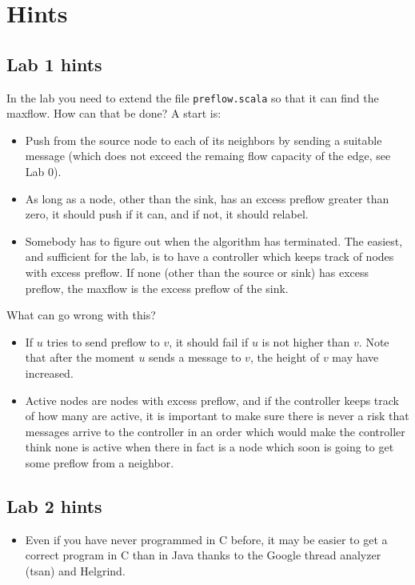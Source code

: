 \documentclass{forsete}
\begin{document}
{\section{Hints}
\subsection*{Lab 1 hints}
In the lab you need to extend the file \verb!preflow.scala! so that it can find the maxflow.
How can that be done? A start is:

\begin{itemize}
\item Push from the source node to each of its neighbors by sending a suitable message (which does not exceed
the remaing flow capacity of the edge, see Lab 0).
\item As long as a node, other than the sink, has an excess preflow greater than zero, it should 
push if it can, and if not, it should relabel.
\item Somebody has to figure out when the algorithm has terminated. The easiest, and sufficient for the lab,
is to have a controller which keeps track of nodes with excess preflow. If none (other than the source or sink)
has excess preflow, the maxflow is the excess preflow of the sink.
\end{itemize}

What can go wrong with this?
\begin{itemize}
\item If $u$ tries to send preflow to $v$, it should fail if $u$ is not higher than $v$.
Note that after the moment $u$ sends a message to $v$, the height of $v$ may have increased.

\item Active nodes are nodes with excess preflow, and if the controller keeps track of how many are active,
it is important to make sure there is never a risk that messages arrive to the controller in an order which
would make the controller think none is active when there in fact is a node which soon is going to get some
preflow from a neighbor.

\end{itemize}


\subsection*{Lab 2 hints}
\begin{itemize}
\item Even if you have never programmed in C before, it may be easier 
to get a correct program in C than in Java thanks to the Google thread analyzer (tsan) and Helgrind.


\end{itemize}}
\end{document}

